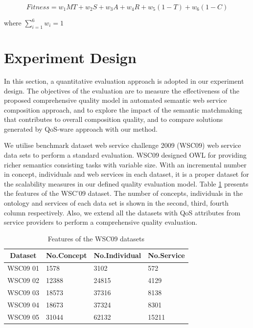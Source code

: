 \documentclass{llncs}
\begin{document}
\begin{equation}
\label{equation7}
Fitness = w_1MT + w_2S + w_3A + w_4R + w_5(1 - T) + w_6(1 - C)
\end{equation}

\noindent where $\sum_{i=1}^{6} w_i = 1$

\section{Experiment Design}\label{experiment_design}
In this section, a quantitative evaluation approach is adopted in our experiment design. The objectives of the evaluation are to measure the effectiveness of the proposed comprehensive quality model in automated semantic web service composition approach, and to explore the impact of the semantic matchmaking that contributes to overall composition quality, and to compare solutions generated by QoS-ware approach with our method.

We utilise benchmark dataset web service challenge 2009 (WSC09) \cite{kona2009wsc} web service data sets to perform a standard evaluation. WSC09 designed OWL for providing richer semantics consisting tasks with variable size. With an incremental number in concept, individuals and web services in each dataset, it is a proper dataset for the scalability measures in our defined quality evaluation model. Table \ref{wsc09datasetTable} presents the features of the WSC’09 dataset. The number of concepts, individuals in the ontology and services of each data set is shown in the second, third, fourth column respectively. Also, we extend all the datasets with QoS attributes from service providers to perform a comprehensive quality evaluation. 
\begin{table}[]
\centering
\caption{Features of the WSC09 datasets}
\label{wsc09datasetTable}
\begin{tabular}{|l|l|l|l|}
\hline
\multicolumn{1}{|c|}{Dataset} & No.Concept & No.Individual & No.Service \\ \hline
WSC09 01                     & 1578       &3102           &572      \\ \hline
WSC09 02                     & 12388      &24815          &4129      \\ \hline
WSC09 03                     & 18573      &37316          &8138      \\ \hline
WSC09 04                     & 18673      &37324          &8301      \\ \hline
WSC09 05                     & 31044      &62132          &15211    \\ \hline
\end{tabular}
\end{table}
\end{document}
